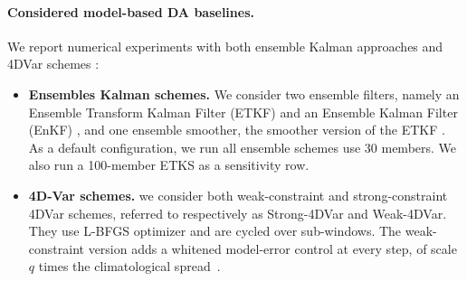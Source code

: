 \paragraph{Considered model-based DA baselines.}
We report numerical experiments with both ensemble Kalman approaches and 4DVar schemes \cite{carrassi_data_2018}:
\begin{itemize}[leftmargin=*]
  \item \textbf{Ensembles Kalman schemes.} We consider two ensemble filters, namely 
  an Ensemble Transform Kalman Filter (ETKF) \cite{bishop_adaptive_2001,hunt_efficient_2007} and an Ensemble Kalman Filter (EnKF) \cite{evensen_data_2009}, and one ensemble smoother, the smoother version of the ETKF \cite{bishop_adaptive_2001,hunt_efficient_2007}. As a default configuration, we run all ensemble schemes use 30 members. We also run a 100-member ETKS as a sensitivity row.
  \item \textbf{4D-Var schemes.} we consider both weak-constraint and strong-constraint 4DVar schemes, referred to respectively as Strong-4DVar and Weak-4DVar. They use L-BFGS optimizer and are cycled over sub-windows. The weak-constraint version adds a whitened model-error control at every step, of scale $q$ times the climatological
  spread~\cite{tremolet_accounting_2006}.
\end{itemize}

